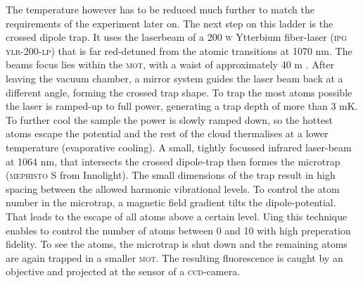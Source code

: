 The temperature however has to be reduced much further to match the requirements of the experiment later on. The next step on this ladder is the crossed dipole trap. 
It uses the laserbeam of a 200 \textsc{w} Ytterbium fiber-laser (\textsc{ipg ylr-200-lp}) that is far red-detuned from the atomic transitions at 1070 nm. The beams focus lies within the \textsc{mot}, with a waist of approximately 40 \mu m \cite{lompe}. After leaving the vacuum chamber, a mirror system guides the laser beam back at a different angle, forming the crossed trap shape. To trap the most atoms possible the laser is ramped-up to full power, generating a trap depth of more than 3 mK. To further cool the sample the power is slowly ramped down, so the hottest atoms escape the potential and the rest of the cloud thermalises at a lower temperature (evaporative cooling). A small, tightly focussed infrared laser-beam at 1064 nm, that intersects the crossed dipole-trap then formes the microtrap (\textsc{mephisto S} from Innolight). The small dimensions of the trap result in high spacing between the allowed harmonic vibrational levels. To control the atom number in the microtrap, a magnetic field gradient tilts the dipole-potential. That leads to the escape of all atoms above a certain level. Uing this technique enables to control the number of atoms between 0 and 10 with high preperation fidelity. To see the atoms, the microtrap is shut down and the remaining atoms are again trapped in a smaller \textsc{mot}. The resulting fluorescence is caught by an objective and projected at the sensor of a \textsc{ccd}-camera. 
